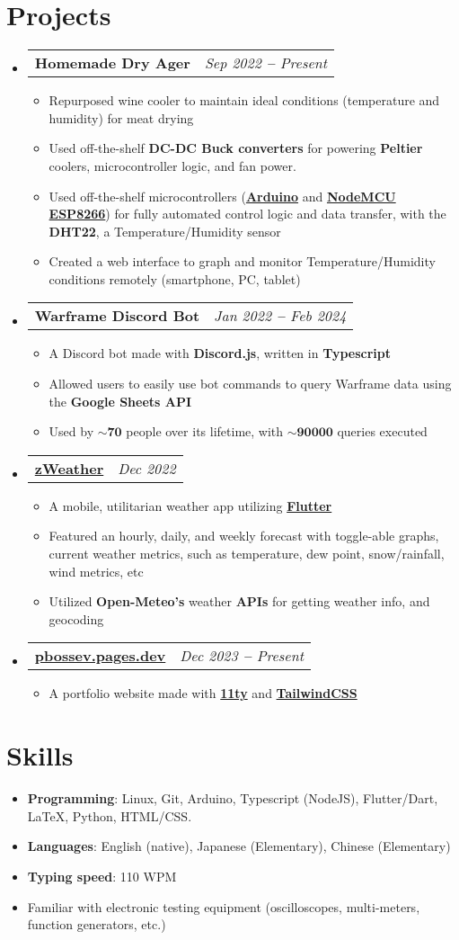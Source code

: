 \documentclass[letterpaper,9pt]{article}
\makeatletter
\newcommand{\cvSubItem}[1]{
  \item\small{
    {#1 \vspace{-2pt}}
  }
}
\newcommand{\cvTwo}[2]{
  \vspace{-2pt}\item
    \begin{tabular*}{1\textwidth}[t]{l@{\extracolsep{\fill}}r}
      \textbf{#1} & \textit{\small #2} \\
    \end{tabular*}\vspace{-5pt}
}
\newcommand{\cvItem}[1]{
  \item{
    #1
  }
  \vspace{-5pt}
}
\newcommand{\cvBodyStart}{\begin{itemize}[leftmargin=0.15in, label={}]}
\newcommand{\cvBodyEnd}{\end{itemize}}
\newcommand{\cvListStart}{\begin{itemize}}
\newcommand{\cvListEnd}{\end{itemize}\vspace{-5pt}}
\newcommand{\cvRegListStart}{\begin{itemize}[leftmargin=0.22in, label={}]}
\newcommand{\cvRegListEnd}{\end{itemize}}
\makeatother
\begin{document}
\section{Projects}
\cvBodyStart
    \cvTwo{Homemade Dry Ager}{Sep 2022 \textbf{--} Present}
    \cvListStart
        \cvSubItem{Repurposed wine cooler to maintain ideal conditions (temperature and humidity) for meat drying}
        \cvSubItem{Used off-the-shelf \textbf{DC-DC Buck converters} for powering \textbf{Peltier} coolers, microcontroller logic, and fan power.}
        \cvSubItem{Used off-the-shelf microcontrollers (\textbf{\href{https://www.arduino.cc/}{Arduino}} and \textbf{\href{https://en.wikipedia.org/wiki/NodeMCU}{NodeMCU ESP8266}}) for fully automated control logic and data transfer, with the \textbf{DHT22}, a Temperature/Humidity sensor}
        \cvSubItem{Created a web interface to graph and monitor Temperature/Humidity conditions remotely (smartphone, PC, tablet)}
    \cvListEnd
    \cvTwo{Warframe Discord Bot}{Jan 2022 \textbf{--} Feb 2024}
    \cvListStart
        \cvSubItem{A Discord bot made with \textbf{Discord.js}, written in \textbf{Typescript}}
        \cvSubItem{Allowed users to easily use bot commands to query Warframe data using the \textbf{Google Sheets API}}
        \cvSubItem{Used by $\mathbf{\sim70}$ people over its lifetime, with $\mathbf{\sim90000}$ queries executed}
    \cvListEnd
    \cvTwo{\href{https://pbossev.pages.dev/projects/zweather/}{zWeather}}{Dec 2022}
    \cvListStart
        \cvSubItem{A mobile, utilitarian weather app utilizing \textbf{\href{https://flutter.dev/}{Flutter}}}
        \cvSubItem{Featured an hourly, daily, and weekly forecast with toggle-able graphs, current weather metrics, such as temperature, dew point, snow/rainfall, wind metrics, etc}
        \cvSubItem{Utilized \textbf{Open-Meteo's} weather \textbf{APIs} for getting weather info, and geocoding}
    \cvListEnd
    \cvTwo{\href{https://pbossev.pages.dev/}{pbossev.pages.dev}}{Dec 2023 \textbf{--} Present}
    \cvListStart
        \cvSubItem{A portfolio website made with \textbf{\href{https://www.11ty.dev/}{11ty}} and \textbf{\href{https://tailwindcss.com/}{TailwindCSS}}}
    \cvListEnd
\cvBodyEnd

\section{Skills}
\cvRegListStart
    \cvItem{\textbf{Programming}: Linux, Git, Arduino, Typescript (NodeJS), Flutter/Dart, LaTeX, Python, HTML/CSS. }
    \cvItem{\textbf{Languages}: English (native), Japanese (Elementary), Chinese (Elementary)}
    \cvItem{\textbf{Typing speed}: 110 WPM}
    \cvItem{Familiar with electronic testing equipment (oscilloscopes, multi-meters, function generators, etc.)}
\cvRegListEnd
\end{document}
